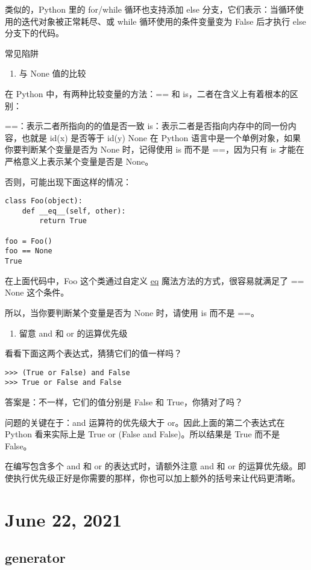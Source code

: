 \documentclass[11pt]{article}
\begin{document}
类似的，Python 里的 for/while 循环也支持添加 else 分支，它们表示：当循环使用的迭代对象被正常耗尽、或 while 循环使用的条件变量变为 False 后才执行 else 分支下的代码。

常见陷阱
\begin{enumerate}
\item 与 None 值的比较
\end{enumerate}
在 Python 中，有两种比较变量的方法：== 和 is，二者在含义上有着根本的区别：

==：表示二者所指向的的值是否一致
is：表示二者是否指向内存中的同一份内容，也就是 id(x) 是否等于 id(y)
None 在 Python 语言中是一个单例对象，如果你要判断某个变量是否为 None 时，记得使用 is 而不是 ==，因为只有 is 才能在严格意义上表示某个变量是否是 None。

否则，可能出现下面这样的情况：
\begin{verbatim}
class Foo(object):
    def __eq__(self, other):
        return True

foo = Foo()
foo == None
True
\end{verbatim}

在上面代码中，Foo 这个类通过自定义 \uline{\uline{eq}} 魔法方法的方式，很容易就满足了 == None 这个条件。

所以，当你要判断某个变量是否为 None 时，请使用 is 而不是 ==。

\begin{enumerate}
\item 留意 and 和 or 的运算优先级
\end{enumerate}
看看下面这两个表达式，猜猜它们的值一样吗？
\begin{verbatim}
>>> (True or False) and False
>>> True or False and False
\end{verbatim}
答案是：不一样，它们的值分别是 False 和 True，你猜对了吗？

问题的关键在于：and 运算符的优先级大于 or。因此上面的第二个表达式在 Python 看来实际上是 True or (False and False)。所以结果是 True 而不是 False。

在编写包含多个 and 和 or 的表达式时，请额外注意 and 和 or 的运算优先级。即使执行优先级正好是你需要的那样，你也可以加上额外的括号来让代码更清晰。

\section{June 22, 2021}
\label{sec:orgf57ba26}

\subsection{generator}
\label{sec:org490b4ae}
\end{document}
